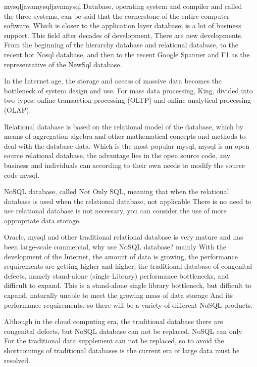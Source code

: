 
\begin{Eabstract}{mysql}{java}{mysql}{java}{mysql}
Database, operating system and compiler and called the three systems, can be said that the cornerstone of the entire computer software. Which is closer to the application layer database, is a lot of business support. This field after decades of development,
There are new developments. From the beginning of the hierarchy database and relational database, to the recent hot Nosql database, and then to the recent Google Spanner and F1 as the representative of the NewSql database.

In the Internet age, the storage and access of massive data becomes the bottleneck of system design and use. For mass data processing,
King, divided into two types: online transaction processing (OLTP) and online analytical processing (OLAP).

Relational database is based on the relational model of the database, which by means of aggregation algebra and other mathematical concepts and methods to deal with the database
data. Which is the most popular mysql, mysql is an open source relational database, the advantage lies in the open source code, any business and individuals can according to their own needs to modify the source code mysql.

NoSQL database, called Not Only SQL, meaning that when the relational database is used when the relational database, not applicable
There is no need to use relational database is not necessary, you can consider the use of more appropriate data storage.

Oracle, mysql and other traditional relational database is very mature and has been large-scale commercial, why use NoSQL database? mainly
With the development of the Internet, the amount of data is growing, the performance requirements are getting higher and higher, the traditional database of congenital defects, namely stand-alone (single
Library) performance bottlenecks, and difficult to expand. This is a stand-alone single library bottleneck, but difficult to expand, naturally unable to meet the growing mass of data storage
And its performance requirements, so there will be a variety of different NoSQL products.

Although in the cloud computing era, the traditional database there are congenital defects, but NoSQL database can not be replaced, NoSQL can only
For the traditional data supplement can not be replaced, so to avoid the shortcomings of traditional databases is the current era of large data must be resolved.


\end{Eabstract}
